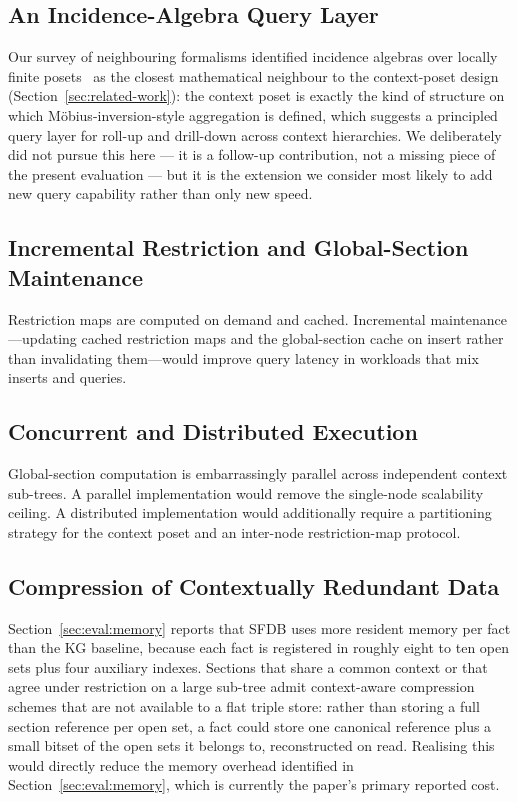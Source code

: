 \subsection{An Incidence-Algebra Query Layer}
\label{sec:future:incidence}

Our survey of neighbouring formalisms identified incidence algebras over
locally finite posets~\cite{rota1964moebius} as the closest mathematical
neighbour to the context-poset design
(Section~\ref{sec:related-work}): the context poset is exactly the kind
of structure on which M{\"o}bius-inversion-style aggregation is defined,
which suggests a principled query layer for roll-up and drill-down
across context hierarchies. We deliberately did not pursue this here ---
it is a follow-up contribution, not a missing piece of the present
evaluation --- but it is the extension we consider most likely to add
new query capability rather than only new speed.

\subsection{Incremental Restriction and Global-Section Maintenance}
\label{sec:future:incremental}

Restriction maps are computed on demand and cached. Incremental
maintenance---updating cached restriction maps and the global-section
cache on insert rather than invalidating them---would improve query
latency in workloads that mix inserts and queries.

\subsection{Concurrent and Distributed Execution}
\label{sec:future:distributed}

Global-section computation is embarrassingly parallel across independent
context sub-trees. A parallel implementation would remove the single-node
scalability ceiling. A distributed implementation would additionally
require a partitioning strategy for the context poset and an inter-node
restriction-map protocol.

\subsection{Compression of Contextually Redundant Data}
\label{sec:future:compression}

Section~\ref{sec:eval:memory} reports that SFDB uses \rangememkg{}
more resident memory per fact than the KG baseline, because each fact is
registered in roughly eight to ten open sets plus four auxiliary indexes.
Sections that share a common context or that agree under restriction on a
large sub-tree admit context-aware compression schemes that are not
available to a flat triple store: rather than storing a full section
reference per open set, a fact could store one canonical reference plus a
small bitset of the open sets it belongs to, reconstructed on read.
Realising this would directly reduce the memory overhead identified in
Section~\ref{sec:eval:memory}, which is currently the paper's primary
reported cost.

